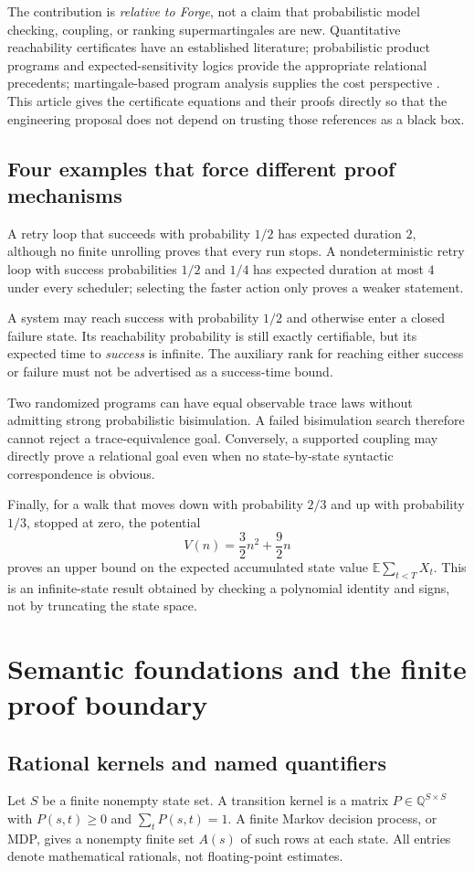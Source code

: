 \documentclass[11pt,letterpaper]{article}
\theoremstyle{definition}\newtheorem{definition}[theorem]{Definition}
\theoremstyle{remark}\newtheorem{remark}[theorem]{Remark}
\newcommand{\Q}{\mathbb Q}\newcommand{\R}{\mathbb R}\newcommand{\N}{\mathbb N}
\newcommand{\E}{\mathbb E}\newcommand{\Prob}{\mathbb P}
\begin{document}
The contribution is \emph{relative to Forge}, not a claim that probabilistic model checking, coupling, or ranking supermartingales are new. Quantitative reachability certificates have an established literature; probabilistic product programs and expected-sensitivity logics provide the appropriate relational precedents; martingale-based program analysis supplies the cost perspective \cite{farkas,coupling,sensitivity,martingales}. This article gives the certificate equations and their proofs directly so that the engineering proposal does not depend on trusting those references as a black box.

\subsection{Four examples that force different proof mechanisms}
A retry loop that succeeds with probability $1/2$ has expected duration $2$, although no finite unrolling proves that every run stops. A nondeterministic retry loop with success probabilities $1/2$ and $1/4$ has expected duration at most $4$ under every scheduler; selecting the faster action only proves a weaker statement.

A system may reach success with probability $1/2$ and otherwise enter a closed failure state. Its reachability probability is still exactly certifiable, but its expected time to \emph{success} is infinite. The auxiliary rank for reaching either success or failure must not be advertised as a success-time bound.

Two randomized programs can have equal observable trace laws without admitting strong probabilistic bisimulation. A failed bisimulation search therefore cannot reject a trace-equivalence goal. Conversely, a supported coupling may directly prove a relational goal even when no state-by-state syntactic correspondence is obvious.

Finally, for a walk that moves down with probability $2/3$ and up with probability $1/3$, stopped at zero, the potential
\[
 V(n)=\frac32 n^2+\frac92 n
\]
proves an upper bound on the expected accumulated state value $\E\sum_{t<T}X_t$. This is an infinite-state result obtained by checking a polynomial identity and signs, not by truncating the state space.

\section{Semantic foundations and the finite proof boundary}
\subsection{Rational kernels and named quantifiers}
Let $S$ be a finite nonempty state set. A transition kernel is a matrix $P\in\Q^{S\times S}$ with $P(s,t)\ge0$ and $\sum_tP(s,t)=1$. A finite Markov decision process, or MDP, gives a nonempty finite set $A(s)$ of such rows at each state. All entries denote mathematical rationals, not floating-point estimates.
\end{document}
